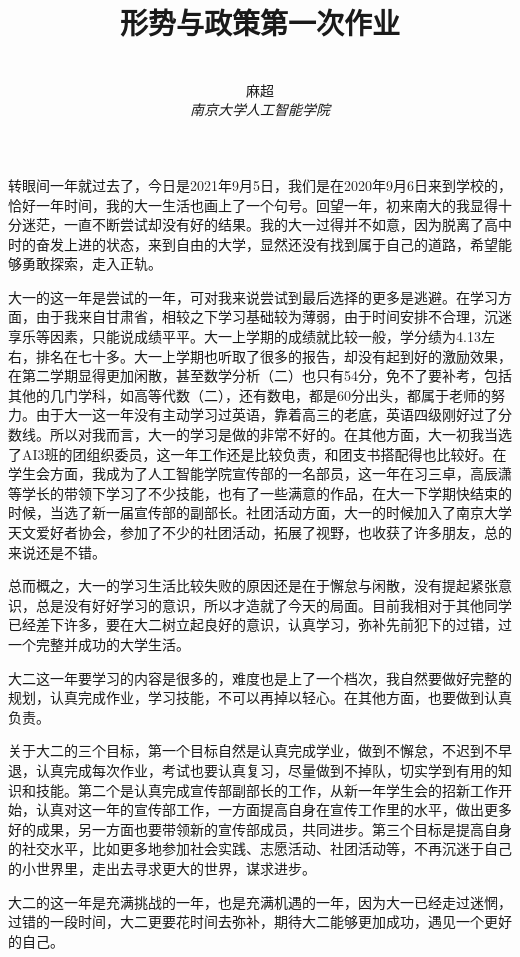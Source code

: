 \documentclass[12pt,a4paper]{article}
\title{\textbf{形势与政策第一次作业}}%
\author{
\\
\Large{麻超 \quad 201300066}
\\[6pt]
{ \large \textit{南京大学人工智能学院}}\\[2pt]
}
\date{}
\begin{document}
\maketitle
\setcounter{page}{1}
转眼间一年就过去了，今日是2021年9月5日，我们是在2020年9月6日来到学校的，恰好一年时间，我的大一生活也画上了一个句号。回望一年，初来南大的我显得十分迷茫，一直不断尝试却没有好的结果。我的大一过得并不如意，因为脱离了高中时的奋发上进的状态，来到自由的大学，显然还没有找到属于自己的道路，希望能够勇敢探索，走入正轨。

大一的这一年是尝试的一年，可对我来说尝试到最后选择的更多是逃避。在学习方面，由于我来自甘肃省，相较之下学习基础较为薄弱，由于时间安排不合理，沉迷享乐等因素，只能说成绩平平。大一上学期的成绩就比较一般，学分绩为4.13左右，排名在七十多。大一上学期也听取了很多的报告，却没有起到好的激励效果，在第二学期显得更加闲散，甚至数学分析（二）也只有54分，免不了要补考，包括其他的几门学科，如高等代数（二），还有数电，都是60分出头，都属于老师的努力。由于大一这一年没有主动学习过英语，靠着高三的老底，英语四级刚好过了分数线。所以对我而言，大一的学习是做的非常不好的。在其他方面，大一初我当选了AI3班的团组织委员，这一年工作还是比较负责，和团支书搭配得也比较好。在学生会方面，我成为了人工智能学院宣传部的一名部员，这一年在习三卓，高辰潇等学长的带领下学习了不少技能，也有了一些满意的作品，在大一下学期快结束的时候，当选了新一届宣传部的副部长。社团活动方面，大一的时候加入了南京大学天文爱好者协会，参加了不少的社团活动，拓展了视野，也收获了许多朋友，总的来说还是不错。

总而概之，大一的学习生活比较失败的原因还是在于懈怠与闲散，没有提起紧张意识，总是没有好好学习的意识，所以才造就了今天的局面。目前我相对于其他同学已经差下许多，要在大二树立起良好的意识，认真学习，弥补先前犯下的过错，过一个完整并成功的大学生活。

大二这一年要学习的内容是很多的，难度也是上了一个档次，我自然要做好完整的规划，认真完成作业，学习技能，不可以再掉以轻心。在其他方面，也要做到认真负责。

关于大二的三个目标，第一个目标自然是认真完成学业，做到不懈怠，不迟到不早退，认真完成每次作业，考试也要认真复习，尽量做到不掉队，切实学到有用的知识和技能。第二个是认真完成宣传部副部长的工作，从新一年学生会的招新工作开始，认真对这一年的宣传部工作，一方面提高自身在宣传工作里的水平，做出更多好的成果，另一方面也要带领新的宣传部成员，共同进步。第三个目标是提高自身的社交水平，比如更多地参加社会实践、志愿活动、社团活动等，不再沉迷于自己的小世界里，走出去寻求更大的世界，谋求进步。

大二的这一年是充满挑战的一年，也是充满机遇的一年，因为大一已经走过迷惘，过错的一段时间，大二更要花时间去弥补，期待大二能够更加成功，遇见一个更好的自己。
\end{document}
